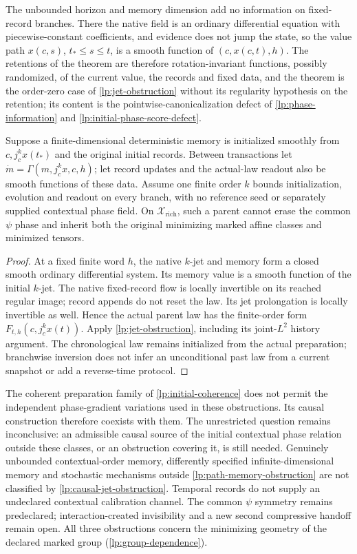 The unbounded horizon and memory dimension add no information on fixed-record branches. There the native field is an ordinary differential equation with piecewise-constant coefficients, and evidence does not jump the state, so the value path $x(c,s)$, $t_*\leq s\leq t$, is a smooth function of $(c,x(c,t),h)$. The retentions of the theorem are therefore rotation-invariant functions, possibly randomized, of the current value, the records and fixed data, and the theorem is the order-zero case of \cref{lp:jet-obstruction} without its regularity hypothesis on the retention; its content is the pointwise-canonicalization defect of \cref{lp:phase-information} and \cref{lp:initial-phase-score-defect}.

Suppose a finite-dimensional deterministic memory is initialized smoothly from $c,j_c^k x(t_*)$ and the original initial records. Between transactions let $\dot m=\Gamma(m,j_c^k x,c,h)$; let record updates and the actual-law readout also be smooth functions of these data. Assume one finite order $k$ bounds initialization, evolution and readout on every branch, with no reference seed or separately supplied contextual phase field. On $\mathcal X_{\mathrm{rich}}$, such a parent cannot erase the common $\psi$ phase and inherit both the original minimizing marked affine classes and minimized tensors.
\begin{proof}
At a fixed finite word $h$, the native $k$-jet and memory form a closed smooth ordinary differential system. Its memory value is a smooth function of the initial $k$-jet. The native fixed-record flow is locally invertible on its reached regular image; record appends do not reset the law. Its jet prolongation is locally invertible as well. Hence the actual parent law has the finite-order form $F_{t,h}(c,j_c^k x(t))$. Apply \cref{lp:jet-obstruction}, including its joint-$L^2$ history argument. The chronological law remains initialized from the actual preparation; branchwise inversion does not infer an unconditional past law from a current snapshot or add a reverse-time protocol.
\end{proof}

The coherent preparation family of \cref{lp:initial-coherence} does not permit the independent phase-gradient variations used in these obstructions. Its causal construction therefore coexists with them. The unrestricted question remains inconclusive: an admissible causal source of the initial contextual phase relation outside these classes, or an obstruction covering it, is still needed. Genuinely unbounded contextual-order memory, differently specified infinite-dimensional memory and stochastic mechanisms outside \cref{lp:path-memory-obstruction} are not classified by \cref{lp:causal-jet-obstruction}. Temporal records do not supply an undeclared contextual calibration channel. The common $\psi$ symmetry remains predeclared; interaction-created invisibility and a new second compressive handoff remain open. All three obstructions concern the minimizing geometry of the declared marked group (\cref{lp:group-dependence}).

